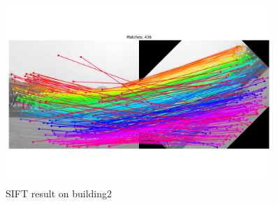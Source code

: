 \documentclass[]{article}
\begin{document}
\begin{figure}[h]
	\centering
	\includegraphics[width=0.90\textwidth]{match_rotate.png}
	\caption{SIFT result on building2}
	\label{fig:sift_result2}
\end{figure}


\newpage
\end{document}
